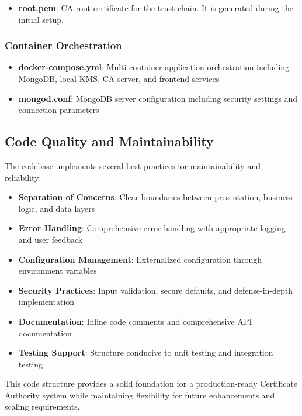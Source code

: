 \begin{itemize}
    \item \textbf{root.pem}: CA root certificate for the trust chain. It is generated during the initial setup.
\end{itemize}

\subsubsection{Container Orchestration}

\begin{itemize}
    \item \textbf{docker-compose.yml}: Multi-container application orchestration including MongoDB, local KMS, CA server, and frontend services
    \item \textbf{mongod.conf}: MongoDB server configuration including security settings and connection parameters
\end{itemize}

\subsection{Code Quality and Maintainability}

The codebase implements several best practices for maintainability and reliability:

\begin{itemize}
    \item \textbf{Separation of Concerns}: Clear boundaries between presentation, business logic, and data layers
    \item \textbf{Error Handling}: Comprehensive error handling with appropriate logging and user feedback
    \item \textbf{Configuration Management}: Externalized configuration through environment variables
    \item \textbf{Security Practices}: Input validation, secure defaults, and defense-in-depth implementation
    \item \textbf{Documentation}: Inline code comments and comprehensive API documentation
    \item \textbf{Testing Support}: Structure conducive to unit testing and integration testing
\end{itemize}

This code structure provides a solid foundation for a production-ready Certificate Authority system while maintaining flexibility for future enhancements and scaling requirements.